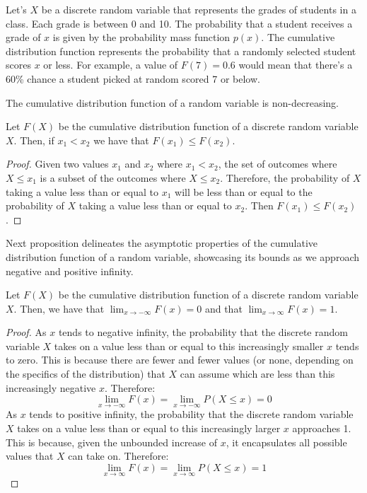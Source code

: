\begin{example}
Let's $X$ be a discrete random variable that represents the grades of students in a class. Each grade is between 0 and 10. The probability that a student receives a grade of $x$ is given by the probability mass function $p(x)$. The cumulative distribution function represents the probability that a randomly selected student scores $x$ or less. For example, a value of $F(7) =
0.6$ would mean that there's a 60\% chance a student picked at random scored 7 or below.
\end{example}

The cumulative distribution function of a random variable is non-decreasing. 

\begin{proposition}
Let $F(X)$ be the cumulative distribution function of a discrete random variable $X$. Then, if $x_{1}<x_{2}$ we have that $F\left(x_{1}\right)\leq F\left(x_{2}\right)$.
\end{proposition}
\begin{proof}
Given two values $x_1$ and $x_2$ where $x_1 < x_2$, the set of outcomes where $X \leq x_1$ is a subset of the outcomes where $X \leq x_2$.  Therefore, the probability of $X$ taking a value less than or equal to $x_1$ will be less than or equal to the probability of $X$ taking a value less than or equal to $x_2$. Then $F(x_1) \leq F(x_2)$.
\end{proof}

Next proposition delineates the asymptotic properties of the cumulative distribution function of a random variable, showcasing its bounds as we approach negative and positive infinity.

\begin{proposition}
Let $F(X)$ be the cumulative distribution function of a discrete random variable $X$. Then, we have that $\lim_{x\rightarrow-\infty}F\left(x\right)=0$ and that $\lim_{x\rightarrow\infty}F\left(x\right)=1$.
\end{proposition}
\begin{proof}
As $x$ tends to negative infinity, the probability that the discrete random variable $X$ takes on a value less than or equal to this increasingly smaller $x$ tends to zero. This is because there are fewer and fewer values (or none, depending on the specifics of the distribution) that $X$ can assume which are less than this increasingly negative $x$. Therefore:
\[
\lim_{x \rightarrow -\infty} F(x) = \lim_{x \rightarrow -\infty} P(X \leq x) = 0 
\]
As $x$ tends to positive infinity, the probability that the discrete random variable $X$ takes on a value less than or equal to this increasingly larger $x$ approaches 1. This is because, given the unbounded increase of $x$, it encapsulates all possible values that $X$ can take on. Therefore:
\[
\lim_{x \rightarrow \infty} F(x) = \lim_{x \rightarrow \infty} P(X \leq x) = 1
\]
\end{proof}

